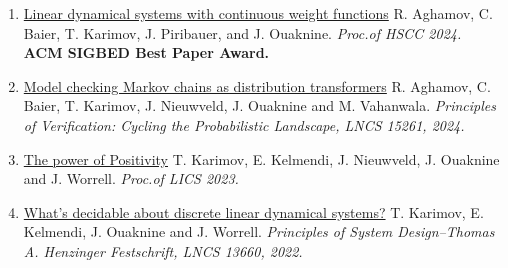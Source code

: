 \documentclass{article}
\begin{document}
\begin{enumerate}
		\item \href{https://dl.acm.org/doi/10.2145/3641513.3650173}{\large Linear dynamical systems with continuous weight functions}
            \vspace*{0.2cm}
		\newline
            R. Aghamov, C. Baier, T. Karimov, J. Piribauer, and J. Ouaknine.
		\vspace*{0.2cm}\newline\emph{Proc.\@ of HSCC 2024.} \textbf{ACM SIGBED Best Paper Award.}
		\vspace*{0.2cm}

            \item 
            \href{https://link.springer.com/chapter/10.2007/978-3-031-75775-4_13}{\large Model checking Markov chains as distribution transformers}
            \vspace{0.2cm}\newline
            R. Aghamov, C. Baier, T. Karimov, J. Nieuwveld, J. Ouaknine and M. Vahanwala.
		\vspace*{0.2cm}\newline
            \emph{Principles of Verification: Cycling the Probabilistic Landscape, LNCS 15261, 2024.}
            \vspace*{0.2cm}
            
		\item 
            \href{https://ieeexplore.ieee.org/document/10175758}{\large The power of Positivity}
            \vspace{0.2cm}\newline
            T. Karimov, E. Kelmendi, J. Nieuwveld, J. Ouaknine and J. Worrell.
            \vspace*{0.2cm}\newline
		  \emph{Proc.\@ of LICS 2023.} 
		\vspace*{0.2cm}
  
		\item 
            \href{https://doi.org/10.2007/978-3-031-22337-2_2}{\large What's decidable about discrete linear dynamical systems?}
            \vspace{0.2cm}\newline
            T. Karimov, E. Kelmendi, J. Ouaknine and J. Worrell.
		\vspace*{0.2cm}\newline
            \emph{Principles of System Design--Thomas A. Henzinger Festschrift, LNCS 13660, 2022.}
            \vspace*{0.2cm}
		

\end{enumerate}
\end{document}
